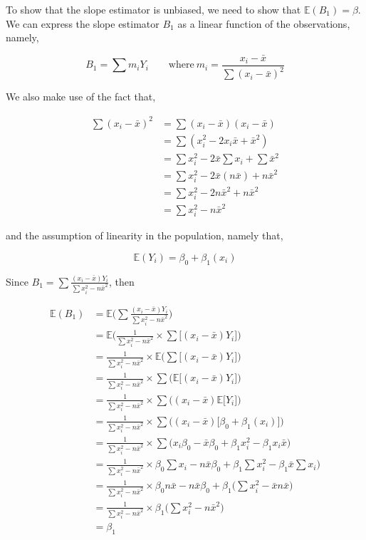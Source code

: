 \documentclass[]{article}
\begin{document}
\frenchspacing

To show that the slope estimator is unbiased, we need to show that
\(\mathbb{E}(B_1) = \beta\). We can express the slope estimator \(B_1\)
as a linear function of the observations, namely,

\[
B_1 = \sum m_iY_i \qquad \mathrm{where~} m_i = \frac{x_i-\bar{x}}{\sum(x_i-\bar{x})^2}
\]

We also make use of the fact that,

\[
\begin{split}
\sum(x_i-\bar{x})^2 &= \sum(x_i-\bar{x})(x_i-\bar{x})\\
&= \sum(x_i^2 -2x_i\bar{x} + \bar{x}^2) \\
&= \sum x_i^2 -2\bar{x} \sum x_i + \sum \bar{x}^2 \\
&= \sum x_i^2 -2\bar{x}(n\bar{x}) + n \bar{x}^2 \\
&= \sum x_i^2 -2n\bar{x}^2 + n \bar{x}^2 \\
&= \sum x_i^2 - n \bar{x}^2
\end{split}
\]

and the assumption of linearity in the population, namely that,

\[
\mathbb{E}(Y_i) = \beta_0 + \beta_1(x_i)
\]

Since \(B_1 = \sum \frac{(x_i-\bar{x})Y_i}{\sum x_i^2 - n \bar{x}^2}\),
then

\[
\begin{align*}
\mathbb{E}(B_1) &= \mathbb{E}\bigg(\sum \frac{(x_i-\bar{x})Y_i}{\sum x_i^2 - n \bar{x}^2}\bigg) \\
&= \mathbb{E}\bigg(\frac{1}{\sum x_i^2 - n \bar{x}^2} \times \sum \bigg[(x_i-\bar{x})Y_i\bigg] \bigg) \\
&= \frac{1}{\sum x_i^2 - n \bar{x}^2} \times \mathbb{E}\bigg(\sum \bigg[(x_i-\bar{x})Y_i\bigg] \bigg) \\
&= \frac{1}{\sum x_i^2 - n \bar{x}^2} \times \sum\bigg(\mathbb{E} \bigg[(x_i-\bar{x})Y_i\bigg] \bigg) \tag*{Expected value of a sum is the sum of an expected value.} \\
&= \frac{1}{\sum x_i^2 - n \bar{x}^2} \times \sum\bigg((x_i-\bar{x})\mathbb{E} \big[Y_i\big] \bigg) \\
&= \frac{1}{\sum x_i^2 - n \bar{x}^2} \times \sum\bigg((x_i-\bar{x})\big[\beta_0 + \beta_1(x_i)\big] \bigg) \tag*{Use definition of linearity assumption.} \\
&= \frac{1}{\sum x_i^2 - n \bar{x}^2} \times \sum\bigg(x_i\beta_0-\bar{x}\beta_0 + \beta_1x_i^2 - \beta_1x_i\bar{x} \bigg) \\
&= \frac{1}{\sum x_i^2 - n \bar{x}^2} \times \beta_0\sum x_i - n\bar{x}\beta_0 + \beta_1 \sum x_i^2 - \beta_1\bar{x}\sum x_i \bigg) \tag*{Distribute sum and pull out constants} \\
&= \frac{1}{\sum x_i^2 - n \bar{x}^2} \times \beta_0n\bar{x} - n\bar{x}\beta_0 + \beta_1 \bigg( \sum x_i^2 - \bar{x}n\bar{x} \bigg) \\
&= \frac{1}{\sum x_i^2 - n \bar{x}^2} \times \beta_1 \bigg( \sum x_i^2 - n\bar{x}^2 \bigg) \\
&= \beta_1
\end{align*}
\]
\end{document}
